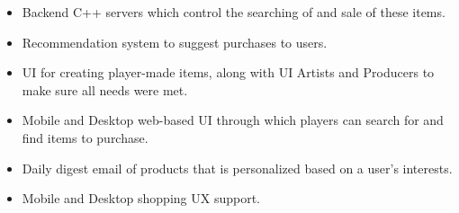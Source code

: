 \documentclass{article}
\begin{document}
\begin{small}
\begin{itemize}
  \item Backend C++ servers which control the searching of and sale of these items.
  \item Recommendation system to suggest purchases to users.
  \item UI for creating player-made items, along with UI Artists  and Producers to make sure all needs were met.
  \item Mobile and Desktop web-based UI through which players can search for and find items to purchase.  
  \item Daily digest email of products that is personalized based on a user's interests.
  \item Mobile and Desktop shopping UX support.
\end{itemize}
\end{small}
\end{document}
